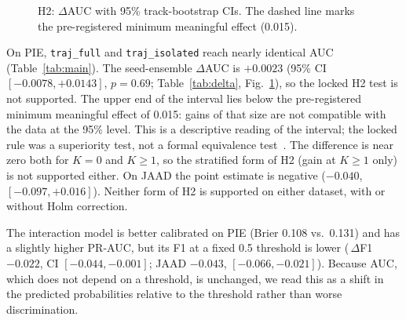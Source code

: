 \documentclass[conference]{IEEEtran}
\newcommand{\dauc}{$\Delta$AUC}
\begin{document}
\begin{figure}[t]
\centering
{}
\caption{H2: \dauc{} with 95\% track-bootstrap CIs. The dashed line marks the pre-registered minimum meaningful effect (0.015).}
\label{fig:h2}
\end{figure}

On PIE, \texttt{traj\_full} and \texttt{traj\_isolated} reach nearly identical AUC (Table~\ref{tab:main}). The seed-ensemble \dauc{} is $+0.0023$ (95\% CI $[-0.0078, +0.0143]$, $p=0.69$; Table~\ref{tab:delta}, Fig.~\ref{fig:h2}), so the locked H2 test is not supported. The upper end of the interval lies below the pre-registered minimum meaningful effect of 0.015: gains of that size are not compatible with the data at the 95\% level. This is a descriptive reading of the interval; the locked rule was a superiority test, not a formal equivalence test~\cite{lakens2017equivalence}. The difference is near zero both for $K=0$ and $K\ge1$, so the stratified form of H2 (gain at $K\ge1$ only) is not supported either. On JAAD the point estimate is negative ($-0.040$, $[-0.097, +0.016]$). Neither form of H2 is supported on either dataset, with or without Holm correction.

The interaction model is better calibrated on PIE (Brier 0.108 vs.\ 0.131) and has a slightly higher PR-AUC, but its F1 at a fixed 0.5 threshold is lower (\,$\Delta$F1 $-0.022$, CI $[-0.044, -0.001]$; JAAD $-0.043$, $[-0.066, -0.021]$). Because AUC, which does not depend on a threshold, is unchanged, we read this as a shift in the predicted probabilities relative to the threshold rather than worse discrimination.
\end{document}
